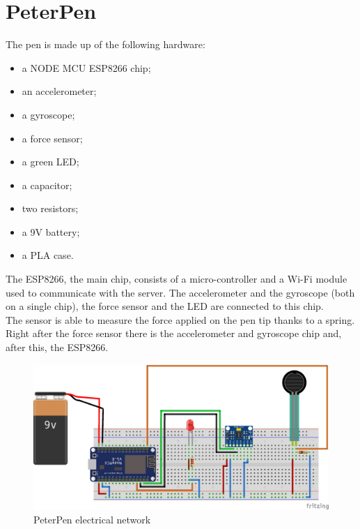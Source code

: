 \documentclass[8pt,notitlepage]{report}
\begin{document}
	\section{PeterPen}
		The pen is made up of the following hardware:
		\begin{itemize}
			\setlength\itemsep{.1em}
			\item a NODE MCU ESP8266 chip;
			\item an accelerometer;
			\item a gyroscope;
			\item a force sensor;
			\item a green LED;
			\item a capacitor;
			\item two resistors;
			\item a 9V battery;
			\item a PLA case.
		\end{itemize}
		The ESP8266, the main chip, consists of a micro-controller and a Wi-Fi module used to communicate with the server. The accelerometer and the gyroscope (both on a single chip), the force sensor and the LED are connected to this chip. \\
		The sensor is able to measure the force applied on the pen tip thanks to a spring. Right after the force sensor there is the accelerometer and gyroscope chip and, after this, the ESP8266. \\
		
		\begin{figure}[H]
			\begin{center}
				\includegraphics[scale=.35]{circuito}
				\caption{PeterPen electrical network}
				\label{fig:circuito}
			\end{center}
		\end{figure}
\end{document}
